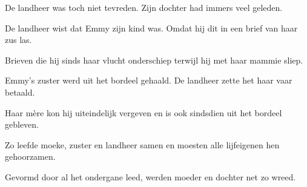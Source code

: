 De landheer was toch niet tevreden.
Zijn dochter had immers veel geleden.

De landheer wist dat Emmy zijn kind was.
Omdat hij dit in een brief van haar zus las.

Brieven die hij sinds haar vlucht onderschiep
terwijl hij met haar mammie sliep.

Emmy’s zuster werd uit het bordeel gehaald.
De landheer zette het haar vaar betaald.

Haar mère kon hij uiteindelijk vergeven
en is ook sindsdien uit het bordeel gebleven.

Zo leefde moeke, zuster en landheer samen
en moesten alle lijfeigenen hen gehoorzamen.

Gevormd door al het ondergane leed,
werden moeder en dochter net zo wreed.

